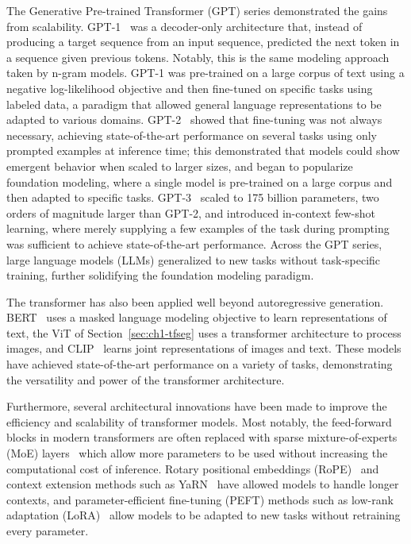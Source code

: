 The Generative Pre-trained Transformer (GPT) series demonstrated the gains from scalability. GPT-1~\cite{radford2018improving} was a decoder-only architecture that, instead of producing a target sequence from an input sequence, predicted the next token in a sequence given previous tokens. Notably, this is the same modeling approach taken by n-gram models. GPT-1 was pre-trained on a large corpus of text using a negative log-likelihood objective and then fine-tuned on specific tasks using labeled data, a paradigm that allowed general language representations to be adapted to various domains. GPT-2~\cite{gpt2} showed that fine-tuning was not always necessary, achieving state-of-the-art performance on several tasks using only prompted examples at inference time; this demonstrated that models could show emergent behavior when scaled to larger sizes, and began to popularize foundation modeling, where a single model is pre-trained on a large corpus and then adapted to specific tasks. GPT-3~\cite{brown2020language} scaled to 175 billion parameters, two orders of magnitude larger than GPT-2, and introduced in-context few-shot learning, where merely supplying a few examples of the task during prompting was sufficient to achieve state-of-the-art performance. Across the GPT series, large language models (LLMs) generalized to new tasks without task-specific training, further solidifying the foundation modeling paradigm.

The transformer has also been applied well beyond autoregressive generation. BERT~\cite{bert} uses a masked language modeling objective to learn representations of text, the ViT of Section~\ref{sec:ch1-tfseg} uses a transformer architecture to process images, and CLIP~\cite{radford2021learning} learns joint representations of images and text. These models have achieved state-of-the-art performance on a variety of tasks, demonstrating the versatility and power of the transformer architecture.

Furthermore, several architectural innovations have been made to improve the efficiency and scalability of transformer models. Most notably, the feed-forward blocks in modern transformers are often replaced with sparse mixture-of-experts (MoE) layers~\cite{shazeer2017outrageously} which allow more parameters to be used without increasing the computational cost of inference. Rotary positional embeddings (RoPE)~\cite{su2024roformer} and context extension methods such as YaRN~\cite{peng2023yarn} have allowed models to handle longer contexts, and parameter-efficient fine-tuning (PEFT) methods such as low-rank adaptation (LoRA)~\cite{hu2022lora} allow models to be adapted to new tasks without retraining every parameter.

